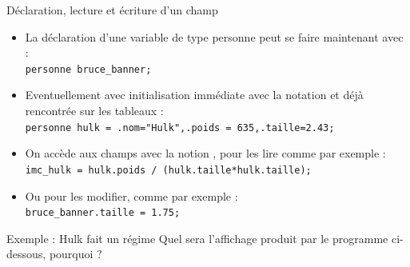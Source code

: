 \documentclass[10pt]{beamer}
\begin{document}
\begin{frame}[fragile]{\Ctitle}{\stitle}
	\begin{exampleblock}{Déclaration, lecture et écriture d'un champ}
		\begin{itemize}
			\item<1-> La déclaration d'une variable de type personne peut se faire maintenant avec : \\
				\texttt{personne bruce_banner;}
			\item<2-> Eventuellement avec initialisation immédiate avec la notation \kw{\{} et \kw{\}} déjà rencontrée sur les tableaux : \\
				\texttt{personne hulk = {.nom="Hulk",.poids = 635,.taille=2.43};}
			\item<3-> On accède aux champs avec la notion , pour les lire comme par exemple :\\
				\texttt{imc_hulk = hulk.poids / (hulk.taille*hulk.taille);}
			\item<4-> Ou pour les modifier, comme par exemple : \\
				\texttt{bruce_banner.taille = 1.75;}
		\end{itemize}
	\end{exampleblock}
\end{frame}

\begin{frame}[fragile]{\Ctitle}{\stitle}
	\begin{exampleblock}{Exemple : Hulk fait un régime}
		Quel sera l'affichage produit par le programme ci-dessous, pourquoi ?
	\end{exampleblock}
\end{frame}
\end{document}
